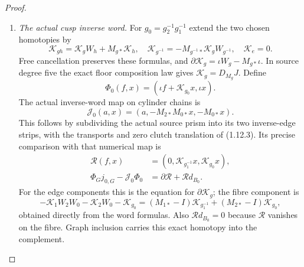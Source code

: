 \begin{proof}
\begin{enumerate}[label=\arabic*.]
These are integral chain-homotopy equivalences as well. The complexes
are free. The cone of each displayed quasi-isomorphism is free and
acyclic; choose a basis of its boundary subgroups and integral
sections $s_k$ of the differential. In the decomposition
$P_k=B_k\oplus s_{k-1}B_{k-1}$, the map
$T(b+s b')=s_kb$ satisfies $\partial T+T\partial=I$.
For a free-homology contraction retain the specified cycle summand
$\iota H_k$ and project onto it; the same formula gives
$\partial T+T\partial=I-\iota p$ and $p\iota=I$.
The maps and diagram homotopies being inverted are already fixed
above; this contraction does not change their markings.

The numerical relation to the preceding common-fibre comparison is
\[
 \Psi_Y=\Psi_Y^Q S_Y.
\]
Here $S_Y$ is $U_G$ on the graph, identity on caps, $U_i$ on the
shifted boundaries, and $+\Gamma_i$ from shifted $B_{i,5}$ to
$E_{i,6}$. Its correction squares to zero, so its inverse subtracts
that correction. The exact literal matrices verify every
differential equation. Thus the actual finite-cap diagram has been
transported with its source maps, target maps and homotopies specified.

\item \emph{The actual cusp inverse word.}
For $g_0=g_2^{-1}g_1^{-1}$ extend the two chosen homotopies by
\[
 \mathcal K_{gh}=\mathcal K_gW_h+M_{g*}\mathcal K_h,\quad
 \mathcal K_{g^{-1}}=-M_{g^{-1}*}\mathcal K_gW_{g^{-1}},\quad
 \mathcal K_e=0.
\]
Free cancellation preserves these formulas, and
$\partial\mathcal K_g=\iota W_g-M_{g*}\iota$.
In source degree five the exact floor composition law gives
$\mathcal K_g=D_{M_g}J$. Define
\[
 \Phi_0(f,x)=(\iota f+\mathcal K_{g_0}x,\iota x).
\]
The actual inverse-word map on cylinder chains is
\[
 \mathcal J_0(a,x)=(a,-M_{2*}M_{0*}x,-M_{0*}x).
\]
This follows by subdividing the actual source prism into its two
inverse-edge strips, with the transports and zero clutch translation
of (1.12.3). Its precise comparison with that numerical map is
\[
\begin{split}
 \mathcal R(f,x)&=(0,\mathcal K_{g_1^{-1}}x,\mathcal K_{g_0}x),\\
 \Phi_Gj_{0,G}-\mathcal J_0\Phi_0
      &=\partial\mathcal R+\mathcal R d_{B_0}.
\end{split}
\]
For the edge components this is the equation for
$\partial\mathcal K_g$; the fibre component is
\[
 -\mathcal K_1W_2W_0-\mathcal K_2W_0-\mathcal K_{g_0}
 =(M_{1*}-I)\mathcal K_{g_1^{-1}}
                      +(M_{2*}-I)\mathcal K_{g_0},
\]
obtained directly from the word formulas. Also
$\mathcal R d_{B_0}=0$ because $\mathcal R$ vanishes on the fibre.
Graph inclusion carries this exact homotopy into the complement.


\end{enumerate}
\end{proof}
